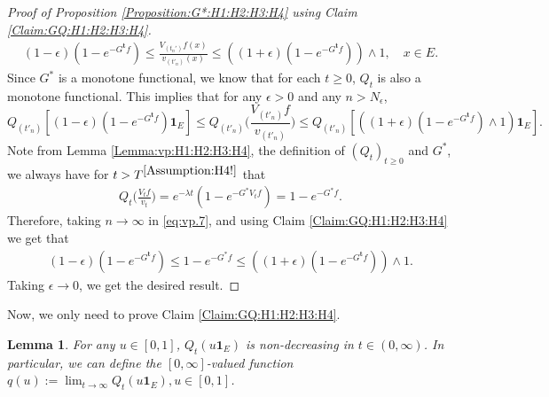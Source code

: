 \documentclass[12pt,a4paper]{amsart}
\numberwithin{equation}{section}
\theoremstyle{plain}
\newtheorem{lem}[thm]{Lemma}
\theoremstyle{definition}
\theoremstyle{remark}
\newcounter{N}
\newcounter{n}[N]
\begin{document}
\begin{proof}[Proof of Proposition \ref{Proposition:G*:H1:H2:H3:H4} using Claim \ref{Claim:GQ:H1:H2:H3:H4}]
\begin{align}
   (1-\epsilon) (1 - e^{- G^{\mathbf t}f} )
   \leq \frac{V_{(t_n')}f(x)}{v_{(t'_n)}(x)}
   \leq ((1+\epsilon) ( 1 - e^{- G^{\mathbf t}f} )) \wedge 1,
   \quad x\in E.
 \end{align}
Since $G^*$ is a monotone functional, we know that for each $t\geq 0$, $Q_t$ is also a monotone functional.
This implies that  for any $\epsilon>0$ and any $n>N_\epsilon$,
\begin{equation}
\label{eq:vp.7}
 Q_{(t'_n)}[ (1-\epsilon) (1-e^{-G^{\mathbf t}f})\mathbf 1_E ]
   \leq Q_{(t'_n)}\Big( \frac{V_{(t'_n)}f}{v_{(t'_n)}} \Big)
   \leq Q_{(t'_n)}[ ( (1+\epsilon) (1-e^{-G^{\mathbf t}f}) \wedge 1) \mathbf 1_E ].
 \end{equation}
Note from Lemma \ref{Lemma:vp:H1:H2:H3:H4}, the definition of $(Q_t)_{t\geq 0}$ and $G^*$, we always have for $t>T^{\ref{Assumption:H4!}}$ that
\begin{align}
 Q_t \Big( \frac{V_tf}{v_t}  \Big)
   = e^{- \lambda t}( 1 - e^{- G^*V_tf}  )
   = 1- e^{- G^* f}.
 \end{align}
Therefore, taking $n \to \infty$ in \eqref{eq:vp.7}, and using Claim \ref{Claim:GQ:H1:H2:H3:H4}  we get that
\begin{align}
 (1 - \epsilon) (1 - e^{- G^{\mathbf t}f})
   \leq 1 - e^{- G^* f}
   \leq ((1 + \epsilon) (1 - e^{- G^{\mathbf t} f}))\wedge 1.
 \end{align}
Taking $\epsilon \to 0$, we get the desired result.
\end{proof}
Now, we only need to prove Claim \ref{Claim:GQ:H1:H2:H3:H4}.

\begin{lem} \label{Lemma:QM!}
For any $u \in [0,1]$, $Q_t(u\mathbf 1_E)$ is non-decreasing in $t\in (0,\infty)$.
In particular, we can define the $[0,\infty]$-valued function $q(u):= \lim_{t\to \infty} Q_t(u\mathbf 1_E), u\in [0,1]$.
\end{lem}
\end{document}
